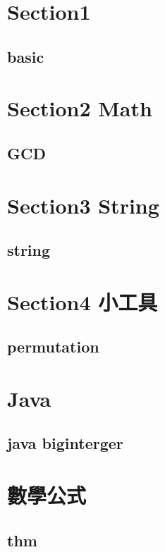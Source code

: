 \section{Section1}
    \subsection{basic}
        
        
\section{Section2 Math}
    \subsection{GCD}
            

\section{Section3 String}
    \subsection{string}
        

\section{Section4 小工具}
    \subsection{permutation}
        

\section{Java}
    \subsection{java biginterger}
        

\section{數學公式}
    \subsection{thm}
        
        
